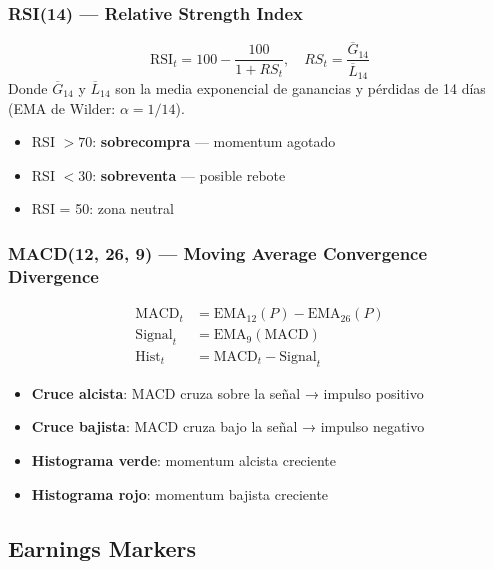 \documentclass[11pt, a4paper]{article}
\begin{document}
\subsubsection{RSI(14) — Relative Strength Index}

\begin{formulabox}
  \[ \text{RSI}_t = 100 - \frac{100}{1 + RS_t}, \quad RS_t = \frac{\overline{G}_{14}}{\overline{L}_{14}} \]
  Donde $\overline{G}_{14}$ y $\overline{L}_{14}$ son la media exponencial de ganancias y pérdidas de 14 días (EMA de Wilder: $\alpha = 1/14$).
  \begin{itemize}
    \item RSI $> 70$: \textbf{sobrecompra} — momentum agotado
    \item RSI $< 30$: \textbf{sobreventa} — posible rebote
    \item RSI = 50: zona neutral
  \end{itemize}
\end{formulabox}

\subsubsection{MACD(12, 26, 9) — Moving Average Convergence Divergence}

\begin{formulabox}[MACD]
  \begin{align}
    \text{MACD}_t      &= \text{EMA}_{12}(P) - \text{EMA}_{26}(P) \\
    \text{Signal}_t    &= \text{EMA}_9(\text{MACD}) \\
    \text{Hist}_t      &= \text{MACD}_t - \text{Signal}_t
  \end{align}
  \begin{itemize}
    \item \textbf{Cruce alcista}: MACD cruza sobre la señal → impulso positivo
    \item \textbf{Cruce bajista}: MACD cruza bajo la señal → impulso negativo
    \item \textbf{Histograma verde}: momentum alcista creciente
    \item \textbf{Histograma rojo}: momentum bajista creciente
  \end{itemize}
\end{formulabox}

\subsection{Earnings Markers}
\end{document}

